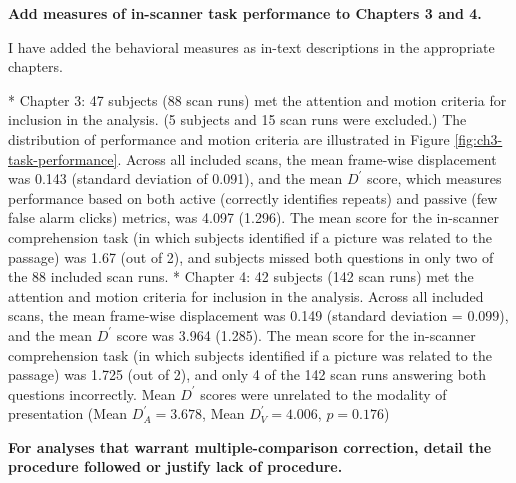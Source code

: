 {\textbf{Add measures of in-scanner task performance to Chapters 3 and 4.}

I have added the behavioral measures as in-text descriptions in the appropriate chapters.

* Chapter 3: 47 subjects (88 scan runs) met the attention and motion criteria for inclusion in the analysis. (5 subjects and 15 scan runs were excluded.) The distribution of performance and motion criteria are illustrated in Figure \ref{fig:ch3-task-performance}. Across all included scans, the mean frame-wise displacement was 0.143 (standard deviation of 0.091), and the mean $D^\prime$ score, which measures performance based on both active (correctly identifies repeats) and passive (few false alarm clicks) metrics, was 4.097 (1.296).  The mean score for the in-scanner comprehension task (in which subjects identified if a picture was related to the passage) was 1.67 (out of 2), and subjects missed both questions in only two of the 88 included scan runs.
* Chapter 4: 42 subjects (142 scan runs) met the attention and motion criteria for inclusion in the analysis. Across all included scans, the mean frame-wise displacement was 0.149 (standard deviation = 0.099), and the mean $D^\prime$ score was 3.964 (1.285).  The mean score for the in-scanner comprehension task (in which subjects identified if a picture was related to the passage) was 1.725 (out of 2), and only 4 of the 142 scan runs answering both questions incorrectly. Mean $D^\prime$ scores were unrelated to the modality of presentation (Mean $D^{\prime}_{A} = 3.678$, Mean $D^{\prime}_{V} = 4.006$, $p = 0.176$) 

\textbf{For analyses that warrant multiple-comparison correction, detail the procedure followed or justify lack of procedure.}

}
